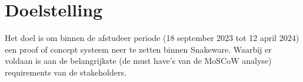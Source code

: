 \section{Doelstelling}
Het doel is om binnen de afstudeer periode (18 september 2023 tot 12 april 2024) een proof of concept systeem neer te zetten binnen Snakeware.
Waarbij er voldaan is aan de belangrijkste (de must have's van de MoSCoW analyse) requirements van de stakeholders.
